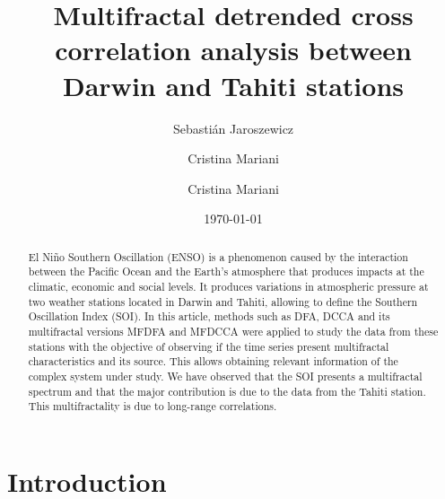 \documentclass[onecolumn, preprint,aps,amsmath, amssymb, superscriptaddress]{revtex4}
\begin{document}
\title{Multifractal detrended cross correlation analysis between Darwin and Tahiti stations}

\author{Sebastián Jaroszewicz}
\author{Cristina Mariani}
\author{Cristina Mariani}

\date{\today}

\begin{abstract}

El Niño Southern Oscillation (ENSO) is a phenomenon caused by the interaction between the Pacific Ocean and the Earth's atmosphere that produces impacts at the climatic, economic and social levels. It produces variations in atmospheric pressure at two weather stations located in Darwin and Tahiti, allowing to define the Southern Oscillation Index (SOI). In this article, methods such as DFA, DCCA and its multifractal versions MFDFA and MFDCCA were applied to study the data from these stations with the objective of observing if the time series present multifractal characteristics and its source. This allows obtaining relevant information of the complex system under study. We have observed that the SOI presents a multifractal spectrum and that the major contribution is due to the data from the Tahiti station. This multifractality is due to long-range correlations.

\end{abstract}

\maketitle

\section{Introduction}
\label{sec:Intro}
\end{document}

